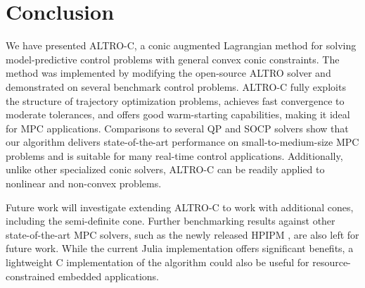 \documentclass[../root.tex]{subfiles}
\begin{document}
\section{Conclusion}
We have presented ALTRO-C, a conic augmented Lagrangian method for solving
model-predictive control problems with general convex conic constraints. The
method was implemented by modifying the open-source ALTRO solver and
demonstrated on several benchmark control problems. ALTRO-C fully exploits
the structure of trajectory optimization problems, achieves fast convergence
to moderate tolerances, and offers good warm-starting capabilities, making it
ideal for MPC applications. Comparisons to several QP and SOCP solvers show
that our algorithm delivers state-of-the-art performance on
small-to-medium-size MPC problems and is suitable for many real-time control
applications. Additionally, unlike other specialized conic solvers, ALTRO-C
can be readily applied to nonlinear and non-convex problems.

Future work will investigate extending ALTRO-C to work with additional cones,
including the semi-definite cone. Further benchmarking results against other
state-of-the-art MPC solvers, such as the newly released HPIPM
\cite{frison_HPIPM_2020}, are also left for future work. While the current
Julia implementation offers significant benefits, a lightweight C
implementation of the algorithm could also be useful for resource-constrained
embedded applications.
\end{document}
